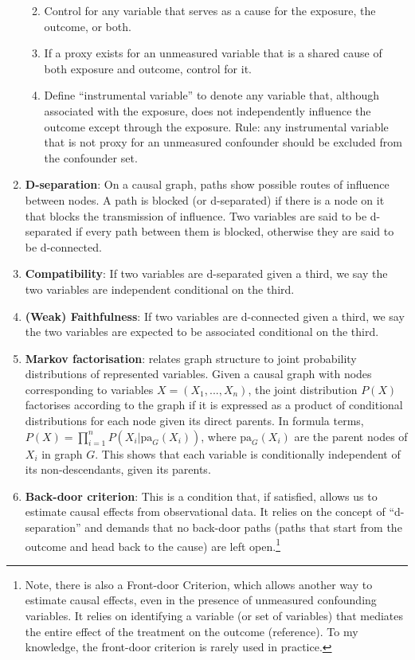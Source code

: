 \documentclass[
  singlecolumn]{report}
\begin{document}
\begin{enumerate}
  \begin{enumerate}
  \def\labelenumii{\alph{enumii}.}
  \item
    Control for any variable that serves as a cause for the exposure,
    the outcome, or both.
  \item
    If a proxy exists for an unmeasured variable that is a shared cause
    of both exposure and outcome, control for it.
  \item
    Define ``instrumental variable'' to denote any variable that,
    although associated with the exposure, does not independently
    influence the outcome except through the exposure. Rule: any
    instrumental variable that is not proxy for an unmeasured confounder
    should be excluded from the confounder set.
  \end{enumerate}
\item
  \textbf{D-separation}: On a causal graph, paths show possible routes
  of influence between nodes. A path is blocked (or d-separated) if
  there is a node on it that blocks the transmission of influence. Two
  variables are said to be d-separated if every path between them is
  blocked, otherwise they are said to be d-connected.
\item
  \textbf{Compatibility}: If two variables are d-separated given a
  third, we say the two variables are independent conditional on the
  third.
\item
  \textbf{(Weak) Faithfulness}: If two variables are d-connected given a
  third, we say the two variables are expected to be associated
  conditional on the third.
\item
  \textbf{Markov factorisation}: relates graph structure to joint
  probability distributions of represented variables. Given a causal
  graph with nodes corresponding to variables \(X = (X_1, ..., X_n)\),
  the joint distribution \(P(X)\) factorises according to the graph if
  it is expressed as a product of conditional distributions for each
  node given its direct parents. In formula terms,
  \(P(X) = \prod_{i=1}^{n} P(X_i | \text{pa}_G(X_i))\), where
  \(\text{pa}_G(X_i)\) are the parent nodes of \(X_i\) in graph \(G\).
  This shows that each variable is conditionally independent of its
  non-descendants, given its parents.
\item
  \textbf{Back-door criterion}: This is a condition that, if satisfied,
  allows us to estimate causal effects from observational data. It
  relies on the concept of ``d-separation'' and demands that no
  back-door paths (paths that start from the outcome and head back to
  the cause) are left open.\footnote{Note, there is also a Front-door
    Criterion, which allows another way to estimate causal effects, even
    in the presence of unmeasured confounding variables. It relies on
    identifying a variable (or set of variables) that mediates the
    entire effect of the treatment on the outcome (reference). To my
    knowledge, the front-door criterion is rarely used in practice.}
\end{enumerate}
\end{document}

